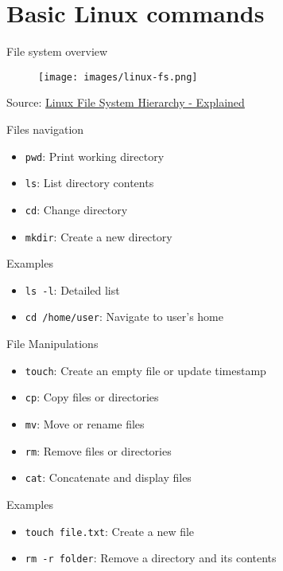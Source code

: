 \documentclass{beamer}
\begin{document}
\section{Basic Linux commands}

\begin{frame}{File system overview}
  \begin{figure}[h]
    \texttt{[image: images/linux-fs.png]}
  \end{figure}

  \footnotesize Source: \href{https://blog.fourninecloud.com/linux-file-system-hierarchy-explained-1d80b2cee03c}{Linux File System Hierarchy - Explained}
\end{frame}

\begin{frame}{Files navigation}
  \begin{itemize}
    \item \texttt{pwd}: Print working directory
    \item \texttt{ls}: List directory contents
    \item \texttt{cd}: Change directory
    \item \texttt{mkdir}: Create a new directory
  \end{itemize}
  \begin{exampleblock}{Examples}
    \begin{itemize}
      \item \texttt{ls -l}: Detailed list
      \item \texttt{cd /home/user}: Navigate to user's home
    \end{itemize}
  \end{exampleblock}
\end{frame}

\begin{frame}{File Manipulations}
  \begin{itemize}
    \item \texttt{touch}: Create an empty file or update timestamp
    \item \texttt{cp}: Copy files or directories
    \item \texttt{mv}: Move or rename files
    \item \texttt{rm}: Remove files or directories
    \item \texttt{cat}: Concatenate and display files
  \end{itemize}
  \begin{exampleblock}{Examples}
    \begin{itemize}
      \item \texttt{touch file.txt}: Create a new file
      \item \texttt{rm -r folder}: Remove a directory and its contents
    \end{itemize}
  \end{exampleblock}
\end{frame}
\end{document}
